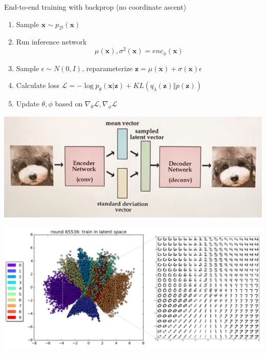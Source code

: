 \documentclass{beamer}
\newcommand{\zvec}{\mathbf{z}}
\newcommand{\xvec}{\mathbf{x}}
\begin{document}
\begin{frame}
  \begin{center}
   \end{center}
End-to-end training with backprop (no coordinate ascent)
\begin{enumerate}
\item Sample $\xvec \sim p_\mathcal{D}(\xvec)$
\item Run inference network 
\[ \mu(\xvec),  \sigma^2(\xvec) = enc_\phi(\xvec)\]
\item Sample $\epsilon \sim N(0, I)$, reparameterize $\zvec = \mu(\xvec) + \sigma (\xvec) \epsilon $
\item Calculate loss $\mathcal{L} = - \log p_\theta(\xvec | \zvec) + KL(q_\lambda(\zvec) \Vert p(\zvec))$
\item Update $\theta, \phi$ based on $\nabla_\theta \mathcal{L}, \nabla_\phi \mathcal{L} $
\end{enumerate}
\end{frame}

\begin{frame}
  \begin{center}
   \end{center}
   \center
   \includegraphics[scale=0.5]{vae-ara}
\end{frame}


\begin{frame}
  \begin{center}
   \end{center}
   \center
   \includegraphics[scale=0.5]{vae2}
\end{frame}
\end{document}

